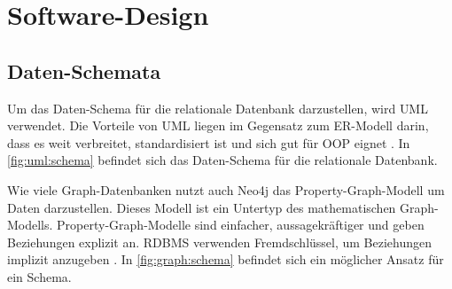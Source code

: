 \section{Software-Design}\label{ch:design}

\subsection{Daten-Schemata}
Um das Daten-Schema für die relationale Datenbank darzustellen, wird \ac{UML} verwendet. Die Vorteile von \ac{UML} liegen im Gegensatz zum \ac{ER-Modell} darin, dass es weit verbreitet, standardisiert ist und sich gut für \ac{OOP} eignet \cite{teorey2011database}. In \autoref{fig:uml:schema} befindet sich das Daten-Schema für die relationale Datenbank.

Wie viele Graph-Datenbanken nutzt auch Neo4j das Property-Graph-Modell um Daten darzustellen. Dieses Modell ist ein Untertyp des mathematischen Graph-Modells. Property-Graph-Modelle sind einfacher, aussagekräftiger und geben Beziehungen explizit an. \ac{RDBMS} verwenden Fremdschlüssel, um Beziehungen implizit anzugeben \cite{lal2015neo4j}. In \autoref{fig:graph:schema} befindet sich ein möglicher Ansatz für ein Schema.

